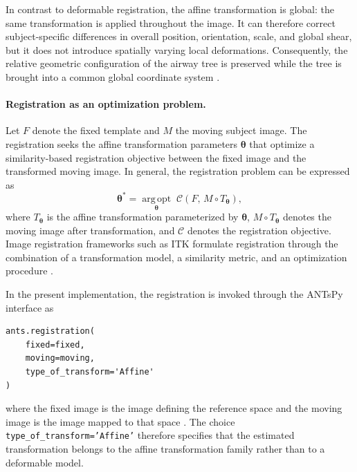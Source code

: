 In contrast to deformable registration, the affine transformation is global:
the same transformation is applied throughout the image. It can therefore
correct subject-specific differences in overall position, orientation, scale,
and global shear, but it does not introduce spatially varying local
deformations. Consequently, the relative geometric configuration of the
airway tree is preserved while the tree is brought into a common global
coordinate system \cite{itk_software_guide,avants2009ants}.

\paragraph{Registration as an optimization problem.}  %

Let $F$ denote the fixed template and $M$ the moving subject image. The
registration seeks the affine transformation parameters
$\boldsymbol{\theta}$ that optimize a similarity-based registration objective
between the fixed image and the transformed moving image. In general, the
registration problem can be expressed as
\begin{equation}
  \boldsymbol{\theta}^{*}
  = \underset{\boldsymbol{\theta}}{\operatorname{arg\,opt}}\;
  \mathcal{C}\left(F,\, M \circ T_{\boldsymbol{\theta}}\right),
  \label{eq:registration_optimization}  %
\end{equation}
where $T_{\boldsymbol{\theta}}$ is the affine transformation parameterized by
$\boldsymbol{\theta}$, $M \circ T_{\boldsymbol{\theta}}$ denotes the moving
image after transformation, and $\mathcal{C}$ denotes the registration
objective. Image registration frameworks such as ITK formulate registration
through the combination of a transformation model, a similarity metric, and
an optimization procedure \cite{itk_software_guide,avants2014itkv4}.

In the present implementation, the registration is invoked through the ANTsPy
interface as

\begin{lstlisting}
ants.registration(
    fixed=fixed,
    moving=moving,
    type_of_transform='Affine'
)
\end{lstlisting}

\noindent where the fixed image is the image defining the reference space and
the moving image is the image mapped to that space \cite{antspy_registration}.
The choice \texttt{type\_of\_transform='Affine'} therefore specifies that the
estimated transformation belongs to the affine transformation family rather
than to a deformable model.

